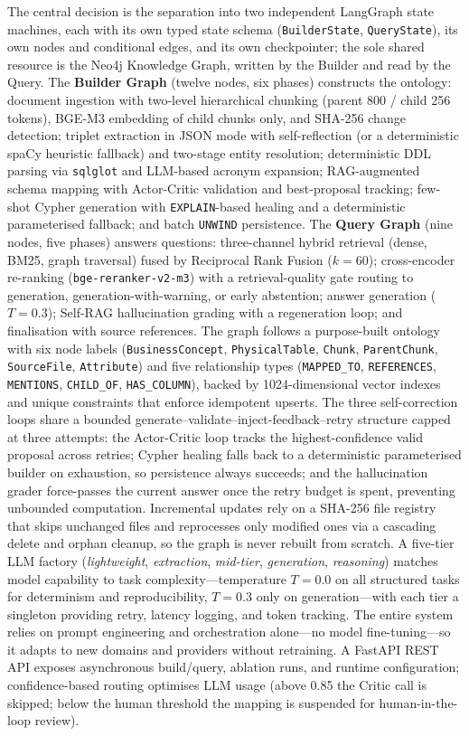\documentclass[11pt,a4paper]{article}
\begin{document}
The central decision is the separation into two independent LangGraph state machines, each with its own typed state schema (\texttt{BuilderState}, \texttt{QueryState}), its own nodes and conditional edges, and its own checkpointer; the sole shared resource is the Neo4j Knowledge Graph, written by the Builder and read by the Query. The \textbf{Builder Graph} (twelve nodes, six phases) constructs the ontology: document ingestion with two-level hierarchical chunking (parent 800 / child 256 tokens), BGE-M3 embedding of child chunks only, and SHA-256 change detection; triplet extraction in JSON mode with self-reflection (or a deterministic spaCy heuristic fallback) and two-stage entity resolution; deterministic DDL parsing via \texttt{sqlglot} and LLM-based acronym expansion; RAG-augmented schema mapping with Actor-Critic validation and best-proposal tracking; few-shot Cypher generation with \texttt{EXPLAIN}-based healing and a deterministic parameterised fallback; and batch \texttt{UNWIND} persistence. The \textbf{Query Graph} (nine nodes, five phases) answers questions: three-channel hybrid retrieval (dense, BM25, graph traversal) fused by Reciprocal Rank Fusion ($k{=}60$); cross-encoder re-ranking (\texttt{bge-reranker-v2-m3}) with a retrieval-quality gate routing to generation, generation-with-warning, or early abstention; answer generation ($T{=}0.3$); Self-RAG hallucination grading with a regeneration loop; and finalisation with source references. The graph follows a purpose-built ontology with six node labels (\texttt{BusinessConcept}, \texttt{PhysicalTable}, \texttt{Chunk}, \texttt{ParentChunk}, \texttt{SourceFile}, \texttt{Attribute}) and five relationship types (\texttt{MAPPED\_TO}, \texttt{REFERENCES}, \texttt{MENTIONS}, \texttt{CHILD\_OF}, \texttt{HAS\_COLUMN}), backed by 1024-dimensional vector indexes and unique constraints that enforce idempotent upserts. The three self-correction loops share a bounded generate--validate--inject-feedback--retry structure capped at three attempts: the Actor-Critic loop tracks the highest-confidence valid proposal across retries; Cypher healing falls back to a deterministic parameterised builder on exhaustion, so persistence always succeeds; and the hallucination grader force-passes the current answer once the retry budget is spent, preventing unbounded computation. Incremental updates rely on a SHA-256 file registry that skips unchanged files and reprocesses only modified ones via a cascading delete and orphan cleanup, so the graph is never rebuilt from scratch. A five-tier LLM factory (\emph{lightweight}, \emph{extraction}, \emph{mid-tier}, \emph{generation}, \emph{reasoning}) matches model capability to task complexity---temperature $T{=}0.0$ on all structured tasks for determinism and reproducibility, $T{=}0.3$ only on generation---with each tier a singleton providing retry, latency logging, and token tracking. The entire system relies on prompt engineering and orchestration alone---no model fine-tuning---so it adapts to new domains and providers without retraining. A FastAPI REST API exposes asynchronous build/query, ablation runs, and runtime configuration; confidence-based routing optimises LLM usage (above 0.85 the Critic call is skipped; below the human threshold the mapping is suspended for human-in-the-loop review).
\end{document}
